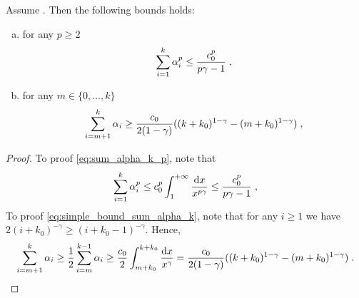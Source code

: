 \begin{lemma}
    \label{lem:bounds_on_sum_step_sizes}
    Assume . Then the following bounds holds:
    \begin{enumerate}[(a)]
        \item \label{eq:sum_alpha_k_p} for any $p\geq 2$
        \begin{equation}
        \sum_{i=1}^{k}\alpha_i^p \leq\frac{c_0^p}{p\gamma-1}\;,
        \end{equation}
        \item \label{eq:simple_bound_sum_alpha_k}
        for any $m\in\{0, \ldots, k\}$
        \begin{equation}
        \sum_{i=m+1}^k\alpha_i \geq  \frac{c_0}{2(1-\gamma)}((k+k_0)^{1-\gamma}-(m+k_0)^{1-\gamma})\;,
        \end{equation}
    \end{enumerate}
\end{lemma}
\begin{proof}
    To proof \ref{eq:sum_alpha_k_p}, note that 
    \begin{equation}
        \sum_{i=1}^{k}\alpha_i^p \leq  c_{0}^p \int_{1}^{+\infty}\frac{\mathrm{d} x}{x^{p\gamma}} \leq \frac{c_0^p}{p\gamma-1}\;,
    \end{equation}
    To proof \ref{eq:simple_bound_sum_alpha_k}, note that for any $i\geq 1$ we have $2(i+k_0)^{-\gamma} \geq (i+k_0-1)^{-\gamma}$. Hence,
    \begin{equation}
        \sum_{i=m+1}^k\alpha_i \geq \frac{1}{2}\sum_{i=m}^{k-1}\alpha_i \geq \frac{c_0}{2}\int_{m+k_0}^{k+k_0}\frac{\mathrm{d} x}{x^{\gamma}} = 
        \frac{c_0}{2(1-\gamma)}((k+k_0)^{1-\gamma}-(m+k_0)^{1-\gamma})\;.
        \end{equation}
\end{proof}


